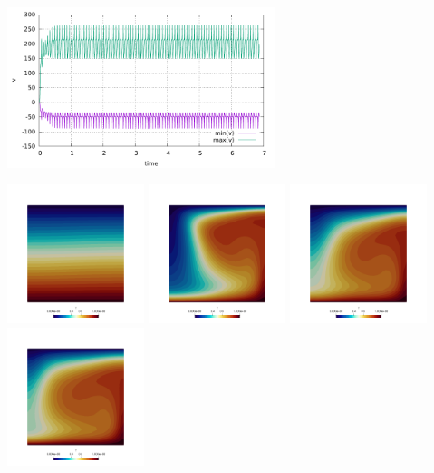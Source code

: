 \begin{center}
\includegraphics[width=7.8cm]{python_codes/fieldstone_28/results_case5/v.pdf}
\end{center}


\newpage
\noindent
\includegraphics[width=4cm]{python_codes/fieldstone_28/results_case5/T_0000}
\includegraphics[width=4cm]{python_codes/fieldstone_28/results_case5/T_0010}
\includegraphics[width=4cm]{python_codes/fieldstone_28/results_case5/T_0020}
\includegraphics[width=4cm]{python_codes/fieldstone_28/results_case5/T_0030}\\
